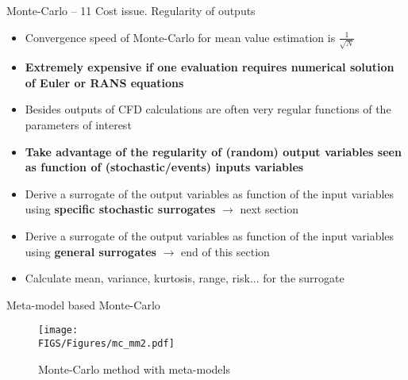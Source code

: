 \documentclass[10pt]{beamer}
\def\vo{\vspace{1mm}}
\def\vt{\vspace{2mm}}
\def\vr{\vspace{3mm}}
\def\vf{\vspace{4mm}}
\def\begit{\begin{itemize}}
\def\endit{\end{itemize}}
\begin{document}
%
%
\begin{frame}{Monte-Carlo -- 11}{ Cost issue. Regularity of outputs} 
%
\begit
%
\item Convergence speed of Monte-Carlo for mean value estimation is $\frac{1}{\sqrt{N}}$ 
\vo
\item[] {\bf Extremely expensive if one evaluation requires numerical solution of Euler or RANS equations}
\vf
\item Besides outputs of CFD calculations are often very regular functions of the parameters of interest
\vt
\item[] {\bf Take advantage of the regularity of (random) output variables seen as function of (stochastic/events) inputs variables }
\vt
\item Derive a surrogate of the output variables as function of the input variables using {\bf specific stochastic surrogates}
 $\rightarrow$ next section
\vt
\item Derive a surrogate of the output variables as function of the input variables using {\bf general surrogates}
 $\rightarrow$ end of this section
\vt
\item Calculate mean, variance, kurtosis, range, risk... for the surrogate
%
\endit 
%
\end{frame} 
%
\begin{frame}{Meta-model based Monte-Carlo} 

\begin{figure}
\begin{center}
\texttt{[image: \\FIGS/Figures/mc\_mm2.pdf]}
\caption{Monte-Carlo method with meta-models}
\end{center}
\end{figure}

\end{frame} 

\end{document}
